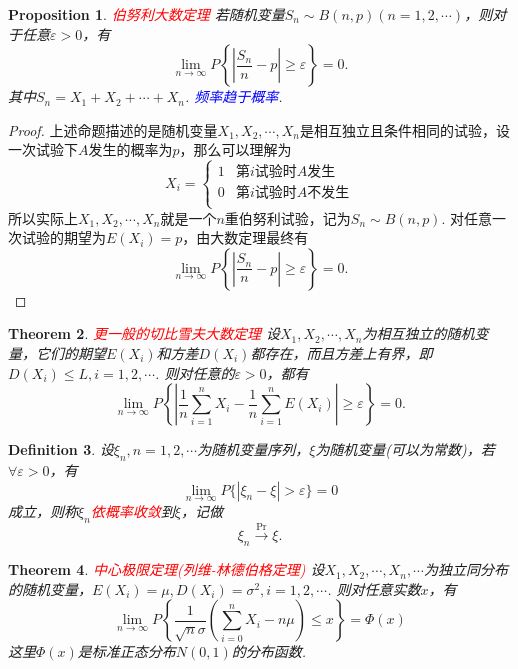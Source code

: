 \documentclass{article}
\newtheorem{theorem}{Theorem}[section]
\newtheorem{proposition}[theorem]{Proposition}
\newtheorem{definition}[theorem]{Definition}
\newcommand{\redt}[1]{\textcolor{red}{#1}}
\newcommand{\bluet}[1]{\textcolor{blue}{#1}}
\begin{document}
\begin{proposition}
\rm \redt{伯努利大数定理} 若随机变量$S_n \sim B(n,p)(n=1,2,\cdots)$，则对于任意$\varepsilon > 0$，有
$$
\lim\limits_{n \rightarrow \infty}P\left\{\left|\frac{S_n}{n} -p\right| \geq \varepsilon\right\} = 0.
$$
其中$S_n = X_1+X_2+\cdots+X_n$. \bluet{频率趋于概率}. 
\end{proposition}

\begin{proof}
\rm 上述命题描述的是随机变量$X_1,X_2,\cdots,X_n$是相互独立且条件相同的试验，设一次试验下$A$发生的概率为$p$，那么可以理解为
$$
X_i = \left\{  \begin{array}{ll}
1 & \text{第$i$试验时$A$发生}\\
0 & \text{第$i$试验时$A$不发生}\\
\end{array}  \right.
$$ 
所以实际上$X_1,X_2,\cdots,X_n$就是一个$n$重伯努利试验，记为$S_n \sim B(n,p)$. 对任意一次试验的期望为$E(X_i) = p$，由大数定理最终有
$$
\lim\limits_{n \rightarrow \infty}P\left\{\left|\frac{S_n}{n} -p\right| \geq \varepsilon\right\} = 0.
$$ 
\end{proof}

\begin{theorem}
\rm \redt{更一般的切比雪夫大数定理} 设$X_1,X_2,\cdots,X_n$为相互独立的随机变量，它们的期望$E(X_i)$和方差$D(X_i)$都存在，而且方差上有界，即$D(X_i) \leq L, i = 1,2,\cdots$. 则对任意的$\varepsilon > 0$，都有
$$
\lim\limits_{n \to \infty} P\left\{ \left| \frac{1}{n} \sum\limits_{i=1}^n X_i - \frac{1}{n} \sum\limits_{i=1}^n E(X_i) \right| \geq \varepsilon \right\} = 0. 
$$
\end{theorem}

\begin{definition}
\rm 设$\xi_n, n = 1,2,\cdots$为随机变量序列，$\xi$为随机变量(可以为常数)，若$\forall \varepsilon > 0$，有
$$
\lim\limits_{n \to \infty} P\{ |\xi_n -\xi| > \varepsilon \} = 0
$$
成立，则称$\xi_n$\redt{依概率收敛}到$\xi$，记做
$$
\xi_n \xrightarrow{\text{Pr}} \xi.
$$
\end{definition}


\begin{theorem}
\rm \redt{中心极限定理(列维-林德伯格定理)} 设$X_1,X_2,\cdots,X_n,\cdots$为独立同分布的随机变量，$E(X_i)=\mu,D(X_i)=\sigma^2,i=1,2,\cdots$. 则对任意实数$x$，有
$$
\lim\limits_{n \rightarrow \infty}P\left\{\frac{1}{\sqrt{n}\sigma}\left(\sum\limits_{i=0}^nX_i - n\mu \right) \leq x\right\} = \Phi(x)
$$
这里$\Phi(x)$是标准正态分布$N(0,1)$的分布函数. 
\end{theorem}
\end{document}
